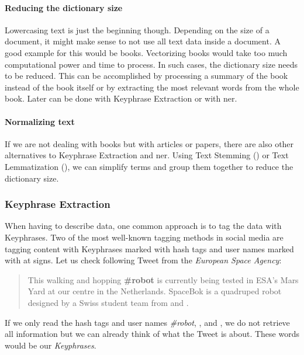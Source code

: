 \paragraph{Reducing the dictionary size}
Lowercasing text is just the beginning though.
Depending on the size of a document, it might make sense to not use all text data inside a document.
A good example for this would be books.
Vectorizing books would take too much computational power and time to process.
In such cases, the dictionary size needs to be reduced.
This can be accomplished by processing a summary of the book instead of the book itself
or by extracting the most relevant words from the whole book.
Later can be done with Keyphrase Extraction or with \Gls{ner}.

\paragraph{Normalizing text}
If we are not dealing with books but with articles or papers,
there are also other alternatives to Keyphrase Extraction and \Gls{ner}.
Using Text Stemming ()
or Text Lemmatization (),
we can simplify terms and group them together to reduce the dictionary size.

\subsubsection{Keyphrase Extraction}
\label{subsubsec:3_keyphrase_extraction}

When having to describe data, one common approach is to tag the data with Keyphrases.
Two of the most well-known tagging methods in social media
are tagging content with Keyphrases marked with hash tags and user names marked with at signs.
Let us check following Tweet from the \textit{European Space Agency}\cite{ESATweet}:

\begin{quotation}
    This walking and hopping \textbf{\#robot} is currently being tested in ESA’s Mars Yard
    at our \textbf{} centre in the Netherlands.
    SpaceBok is a quadruped robot designed by a Swiss student team from \textbf{}
    and \textbf{}.
\end{quotation}

If we only read the hash tags and user names \textit{\#robot}, \textit{},
\textit{} and \textit{},
we do not retrieve all information but we can already think of what the Tweet is about.
These words would be our \textit{Keyphrases}.

